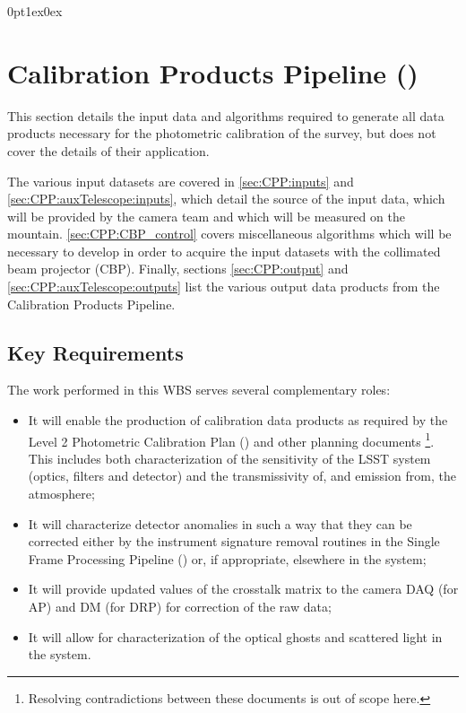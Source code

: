 \titlespacing*{\subsubsection}
{0pt}{1ex}{0ex}


\section{Calibration Products Pipeline (\wbsCPP)}
\label{sec:cpp}

This section details the input data and algorithms required to generate all data products necessary for the photometric calibration of the survey, but does not cover the details of their application.

The various input datasets are covered in \secsymbol\ref{sec:CPP:inputs} and \secsymbol\ref{sec:CPP:auxTelescope:inputs}, which detail the source of the input data, \ie which will be provided by the camera team and which will be measured on the mountain. \secsymbol\ref{sec:CPP:CBP_control} covers miscellaneous algorithms which will be necessary to develop in order to acquire the input datasets with the collimated beam projector (CBP). Finally, sections \secsymbol\ref{sec:CPP:output} and \secsymbol\ref{sec:CPP:auxTelescope:outputs} list the various output data products from the Calibration Products Pipeline.

\subsection{Key Requirements}
\label{sec:CPP:keyRequirements}
The work performed in this WBS serves several complementary roles:

\begin{itemize}
 \item It will enable the production of calibration data products as required by the Level 2 Photometric Calibration Plan (\NewPCP{}) and other planning documents \cite{Lupton15}\footnote{Resolving contradictions between these documents is out of scope here.}. This includes both characterization of the sensitivity of the LSST system (optics, filters and detector) and the transmissivity of, and emission from, the atmosphere;
 
 \item It will characterize detector anomalies in such a way that they can be corrected either by the instrument signature removal routines in the Single Frame Processing Pipeline (\wbsSFM) or, if appropriate, elsewhere in the system;
 
 \item It will provide updated values of the crosstalk matrix to the camera DAQ (for AP) and DM (for DRP) for correction of the raw data;
 
 \item It will allow for characterization of the optical ghosts and scattered light in the system.
\end{itemize}


